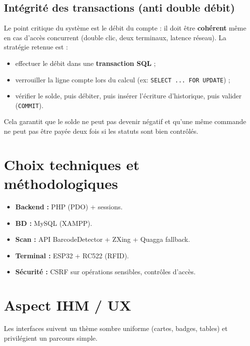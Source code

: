 \documentclass[12pt,a4paper]{report}
\begin{document}
\subsection{Intégrité des transactions (anti double débit)}
Le point critique du système est le débit du compte : il doit être \textbf{cohérent} même en cas d’accès concurrent (double clic, deux terminaux, latence réseau). La stratégie retenue est :
\begin{itemize}
  \item effectuer le débit dans une \textbf{transaction SQL} ;
  \item verrouiller la ligne compte lors du calcul (ex: \texttt{SELECT ... FOR UPDATE}) ;
  \item vérifier le solde, puis débiter, puis insérer l’écriture d’historique, puis valider (\texttt{COMMIT}).
\end{itemize}
Cela garantit que le solde ne peut pas devenir négatif et qu’une même commande ne peut pas être payée deux fois si les statuts sont bien contrôlés.

\section{Choix techniques et méthodologiques}
\begin{itemize}
  \item \textbf{Backend :} PHP (PDO) + sessions.
  \item \textbf{BD :} MySQL (XAMPP).
  \item \textbf{Scan :} API BarcodeDetector + ZXing + Quagga fallback.
  \item \textbf{Terminal :} ESP32 + RC522 (RFID).
  \item \textbf{Sécurité :} CSRF sur opérations sensibles, contrôles d’accès.
\end{itemize}

\section{Aspect IHM / UX}
Les interfaces suivent un thème sombre uniforme (cartes, badges, tables) et privilégient un parcours simple.
\end{document}
